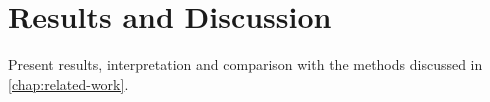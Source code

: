 \chapter{Results and Discussion}\label{chap:results}
Present results, interpretation and comparison with the methods discussed in \autoref{chap:related-work}.
